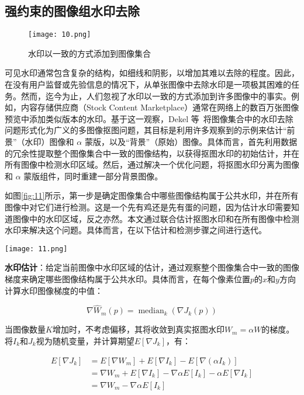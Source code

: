 \subsection{强约束的图像组水印去除}

\begin{figure}[!htbp]
	\centering
	\texttt{[image: 10.png]}
	\caption{水印以一致的方式添加到图像集合}
	\label{fig:10}
\end{figure}

可见水印通常包含复杂的结构，如细线和阴影，以增加其难以去除的程度。因此，在没有用户监督或先验信息的情况下，从单张图像中去除水印是一项极其困难的任务。然而，迄今为止，人们忽视了水印以一致的方式添加到许多图像中的事实。例如，内容存储供应商（Stock Content Marketplace）通常在网络上的数百万张图像预览中添加类似版本的水印。基于这一观察，Dekel 等~\cite{dekel2017effectiveness}将图像集合中的水印去除问题形式化为广义的多图像抠图问题，其目标是利用许多观察到的示例来估计“前景”（水印）图像和 $\alpha$ 蒙版，以及“背景”（原始）图像。具体而言，首先利用数据的冗余性提取整个图像集合中一致的图像结构，以获得抠图水印的初始估计，并在所有图像中检测水印区域。然后，通过解决一个优化问题，将抠图水印分离为图像和 $\alpha$ 蒙版组件，同时重建一部分背景图像。

如图\ref{fig:11}所示，第一步是确定图像集合中哪些图像结构属于公共水印，并在所有图像中对它们进行检测。这是一个先有鸡还是先有蛋的问题，因为估计水印需要知道图像中的水印区域，反之亦然。本文通过联合估计抠图水印和在所有图像中检测水印来解决这个问题。具体而言，在以下估计和检测步骤之间进行迭代。

\begin{figure*}[!htbp]
	\centering
	\texttt{[image: 11.png]}
	\caption{自动水印提取流程示意图}
	\label{fig:11}
\end{figure*}


\noindent\textbf{水印估计}：给定当前图像中水印区域的估计，通过观察整个图像集合中一致的图像梯度来确定哪些图像结构属于公共水印。具体而言，在每个像素位置$p$的$x$和$y$方向计算水印图像梯度的中值：

\begin{equation}
\nabla \widehat{W}_m(p)=\operatorname{median}_k\left(\nabla J_k(p)\right)
\end{equation}

当图像数量$K$增加时，不考虑偏移，其将收敛到真实抠图水印$W_m = \alpha W$的梯度。将$I_k$和$J_k$视为随机变量，并计算期望$E [\nabla J_k]$，有：

\begin{equation}
\begin{aligned}
E\left[\nabla J_k\right] & =E\left[\nabla W_m\right]+E\left[\nabla I_k\right]-E\left[\nabla\left(\alpha I_k\right)\right] \\
& =\nabla W_m+E\left[\nabla I_k\right]-\nabla \alpha E\left[I_k\right]-\alpha E\left[\nabla I_k\right] \\
& =\nabla W_m-\nabla \alpha E\left[I_k\right]
\end{aligned}
\end{equation}

